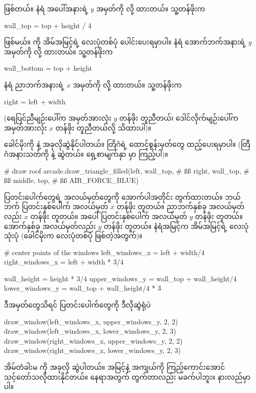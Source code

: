 ဖြစ်တယ်။ နံရံ အပေါ်အနားရဲ့ $y$ အမှတ်ကို  လို့ ထားတယ်။ သူ့တန်ဖိုးက
\begin{codetxt}
wall_top = top + height / 4
\end{codetxt}
ဖြစ်မယ်။  ကို အိမ်အမြင့်ရဲ့ လေးပုံတစ်ပုံ ပေါင်းပေးရမှာပါ။ နံရံ အောက်ဘက်အနားရဲ့ $y$ အမှတ်ကို  လို့ ထားတယ်။ သူ့တန်ဖိုးက
\begin{codetxt}
wall_bottom = top + height
\end{codetxt}
နံရံ ညာဘက်အနားရဲ့ $x$ အမှတ်ကို  လို့ ထားတယ်။ သူ့တန်ဖိုးက
\begin{codetxt}
right = left + width
\end{codetxt}
(ရေပြင်ညီမျဉ်းပေါ်က အမှတ်အားလုံး $y$ တန်ဖိုး တူညီတယ်၊ ဒေါင်လိုက်မျဉ်းပေါ်က အမှတ်အားလုံး $x$ တန်ဖိုး တူညီတယ်လို့ သိထားပါ)။

ခေါင်မိုးကို  နဲ့ အခုလိုဆွဲနိုင်ပါတယ်။ တြိဂံရဲ့ ထောင့်စွန်းမှတ်တွေ ထည့်ပေးရမှာပါ။ (တြီဂံအနားသတ်ကို  နဲ့ ဆွဲတယ်။ ရှေ့စာမျက်နှာ  မှာ ကြည့်ပါ)။ 
\begin{py}
# draw roof 
arcade.draw_triangle_filled(left, wall_top,   # ßß
                            right, wall_top,  # ßß 
                            middle, top,      # ßß
                            AIR_FORCE_BLUE)
\end{py}



ပြတင်းပေါက်တွေရဲ့ အလယ်မှတ်တွေကို အောက်ပါအတိုင်း တွက်ထားတယ်။ ဘယ်ဘက် ပြတင်းနှစ်ပေါက် အလယ်မှတ် $x$ တန်ဖိုး တူတယ်။ ညာဘက်နှစ်ခု အလယ်မှတ်လည်း $x$ တန်ဖိုး တူတယ်။ အပေါ် ပြတင်းနှစ်ပေါက် အလယ်မှတ် $y$ တန်ဖိုး တူတယ်။ အောက်နှစ်ခု အလယ်မှတ်လည်း $y$ တန်ဖိုး တူတယ်။ နံရံအမြင့်က အိမ်အမြင့်ရဲ့ လေးပုံသုံးပုံ (ခေါင်မိုးက လေးပုံတစ်ပုံ ဖြစ်တဲ့အတွက်)။
%
\begin{py}
# center points of the windows
left_windows_x = left + width/4
right_windows_x = left + width * 3/4

wall_height = height * 3/4
upper_windows_y = wall_top + wall_height/4
lower_windows_y = wall_top + wall_height/4 * 3
\end{py}
%
ဒီအမှတ်တွေသိရင် ပြတင်းပေါက်တွေကို ဒီလိုဆွဲရုံပဲ 
%
\begin{py}
draw_window(left_windows_x, upper_windows_y, 2, 2)
draw_window(left_windows_x, lower_windows_y, 2, 3)
draw_window(right_windows_x, upper_windows_y, 2, 2)
draw_window(right_windows_x, lower_windows_y, 2, 3)
\end{py}
%
အိမ်တံခါးမ ကို အခုလို ဆွဲပါတယ်။ အမြင့်နဲ့ အကျယ်ကို ကြည့်ကောင်းအောင် သင့်တော်သလိုထားနိုင်တယ်။ နေရာအတွက် \fEn{,}  တွက်တာလည်း မခက်ပါဘူး။ နားလည်မှာပါ။

